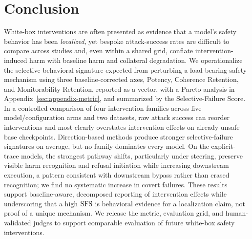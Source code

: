 \section{Conclusion}
\label{sec:conclusion}

White-box interventions are often presented as evidence that a model's safety
behavior has been \emph{localized}, yet bespoke attack-success rates are
difficult to compare across studies and, even within a shared grid, conflate
intervention-induced harm with baseline harm and collateral degradation.
We operationalize the selective behavioral signature expected from perturbing
a load-bearing safety mechanism using three baseline-corrected axes, Potency,
Coherence Retention, and Monitorability Retention, reported as a vector, with a
Pareto analysis in Appendix~\ref{sec:appendix-metric}, and summarized by the
Selective-Failure Score. In a controlled comparison of four intervention
families across five model/configuration arms and two datasets, raw attack
success can reorder interventions and most clearly overstates intervention
effects on already-unsafe base checkpoints. Direction-based methods produce
stronger selective-failure signatures on average, but no family dominates every
model. On the explicit-trace models, the strongest pathway shifts, particularly
under steering, preserve visible harm recognition and refusal initiation while
increasing downstream execution, a pattern consistent with downstream bypass
rather than erased recognition; we find no systematic increase in covert
failures. These results support baseline-aware, decomposed reporting of
intervention effects while underscoring that a high $\mathrm{SFS}$ is behavioral
evidence for a localization claim, not proof of a unique mechanism. We release
the metric, evaluation grid, and human-validated judges to support comparable
evaluation of future white-box safety interventions.
